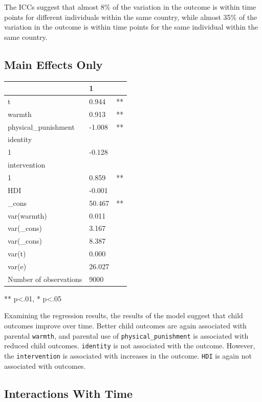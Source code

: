 \documentclass[
  letterpaper,
  DIV=11,
  numbers=noendperiod]{scrreprt}
\begin{document}
The ICCs suggest that almost 8\% of the variation in the outcome is
within time points for different individuals within the same country,
while almost 35\% of the variation in the outcome is within time points
for the same individual within the same country.

\subsection{Main Effects Only}\label{main-effects-only}

\begin{longtable}[]{@{}lll@{}}
\toprule\noalign{}
& 1 & \\
\midrule\noalign{}
\endhead
\bottomrule\noalign{}
\endlastfoot
t & 0.944 & ** \\
warmth & 0.913 & ** \\
physical\_punishment & -1.008 & ** \\
identity & & \\
1 & -0.128 & \\
intervention & & \\
1 & 0.859 & ** \\
HDI & -0.001 & \\
\_cons & 50.467 & ** \\
var(warmth) & 0.011 & \\
var(\_cons) & 3.167 & \\
var(\_cons) & 8.387 & \\
var(t) & 0.000 & \\
var(e) & 26.027 & \\
Number of observations & 9000 & \\
\end{longtable}

** p\textless.01, * p\textless.05

Examining the regression results, the results of the model suggest that
child outcomes improve over time. Better child outcomes are again
associated with parental \texttt{warmth}, and parental use of
\texttt{physical\_punishment} is associated with reduced child outcomes.
\texttt{identity} is not associated with the outcome. However, the
\texttt{intervention} is associated with increases in the outcome.
\texttt{HDI} is again not associated with outcomes.

\subsection{Interactions With Time}\label{sec-interactions-with-time}
\end{document}
